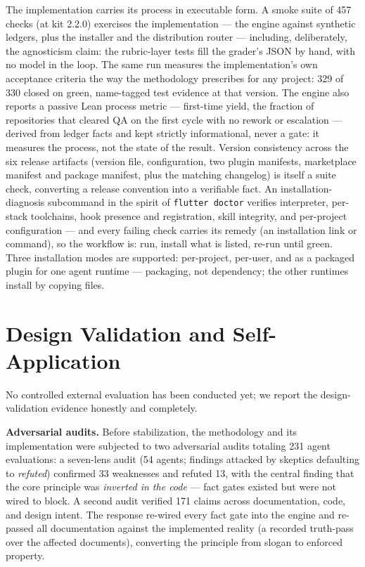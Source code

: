 \documentclass[11pt]{article}
\begin{document}
The implementation carries its process in executable form. A smoke suite of
457 checks (at kit 2.2.0) exercises the implementation --- the engine against
synthetic ledgers, plus the installer and the distribution router --- including,
deliberately, the agnosticism claim: the rubric-layer tests fill the grader's
JSON by hand, with no model in the loop. The same run measures the
implementation's own acceptance criteria the way the methodology prescribes for
any project: 329 of 330 closed on green, name-tagged test evidence at that
version. The engine also reports a passive Lean
process metric --- first-time yield, the fraction of repositories that cleared
QA on the first cycle with no rework or escalation --- derived from ledger facts
and kept strictly informational, never a gate: it measures the process, not the
state of the result. Version consistency across the six
release artifacts (version file, configuration, two plugin manifests,
marketplace manifest and package manifest, plus the matching changelog) is
itself a suite check, converting a release convention
into a verifiable fact. An installation-diagnosis subcommand in the spirit of
\texttt{flutter doctor} verifies interpreter, per-stack toolchains, hook
presence and registration, skill integrity, and per-project configuration ---
and every failing check carries its remedy (an installation link or command),
so the workflow is: run, install what is listed, re-run until green. Three
installation modes are supported: per-project, per-user, and as a packaged
plugin for one agent runtime --- packaging, not dependency; the other runtimes
install by copying files.

\section{Design Validation and Self-Application}\label{sec:validation}

No controlled external evaluation has been conducted yet; we report the
design-validation evidence honestly and completely.

\textbf{Adversarial audits.} Before stabilization, the methodology and its
implementation were subjected to two adversarial audits totaling 231 agent
evaluations: a seven-lens audit (54 agents; findings attacked by skeptics
defaulting to \emph{refuted}) confirmed 33 weaknesses and refuted 13, with the
central finding that the core principle was \emph{inverted in the code} ---
fact gates existed but were not wired to block. A second audit verified 171
claims across documentation, code, and design intent. The response re-wired
every fact gate into the engine and re-passed all documentation against the
implemented reality (a recorded truth-pass over the affected documents),
converting the principle from slogan to enforced property.
\end{document}
